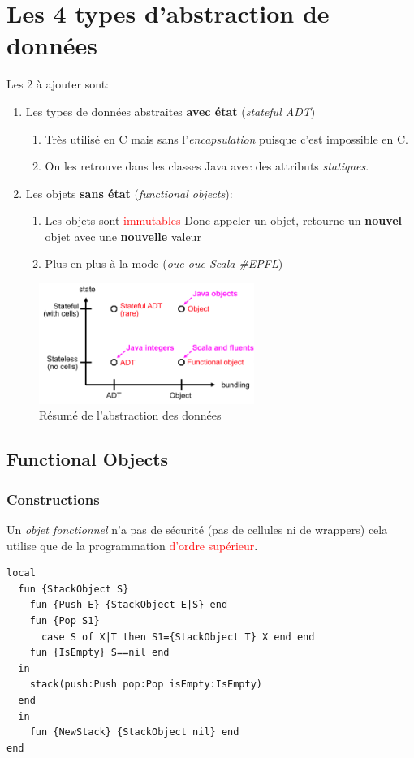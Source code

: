 \documentclass{report}
\begin{document}
\section{Les 4 types d'abstraction de données}

Les 2 à ajouter sont:
\begin{enumerate}
\item Les types de données abstraites \textbf{avec état} (\textit{stateful ADT})
	\begin{enumerate}
	\item Très utilisé en C mais sans l'\textit{encapsulation} puisque c'est impossible en C.
	\item On les retrouve dans les classes Java avec des attributs \textit{statiques}.
	\end{enumerate}
\item Les objets \textbf{sans état} (\textit{functional objects}):
	\begin{enumerate}
	\item Les objets sont \textcolor{red}{immutables} Donc appeler un objet, retourne un \textbf{nouvel} objet avec une \textbf{nouvelle} valeur
	\item Plus en plus à la mode (\textit{oue oue Scala \#EPFL})
	\end{enumerate}
\end{enumerate}
\begin{figure}[H]
\centering
\includegraphics[width=7cm]{img/resAbstract.png}
\caption{Résumé de l'abstraction des données}
\end{figure}

\subsection{Functional Objects}
\subsubsection{Constructions}
Un \textit{objet fonctionnel} n'a pas de sécurité (pas de cellules ni de wrappers) cela utilise que de la programmation \textcolor{red}{d'ordre supérieur}.
\begin{lstlisting}[escapechar=\%]
local 
  fun {StackObject S} 
    fun {Push E} {StackObject E|S} end 
    fun {Pop S1} 
      case S of X|T then S1={StackObject T} X end end 
    fun {IsEmpty} S==nil end
  in
    stack(push:Push pop:Pop isEmpty:IsEmpty) 
  end 
  in 
    fun {NewStack} {StackObject nil} end
end
\end{lstlisting}
\end{document}
